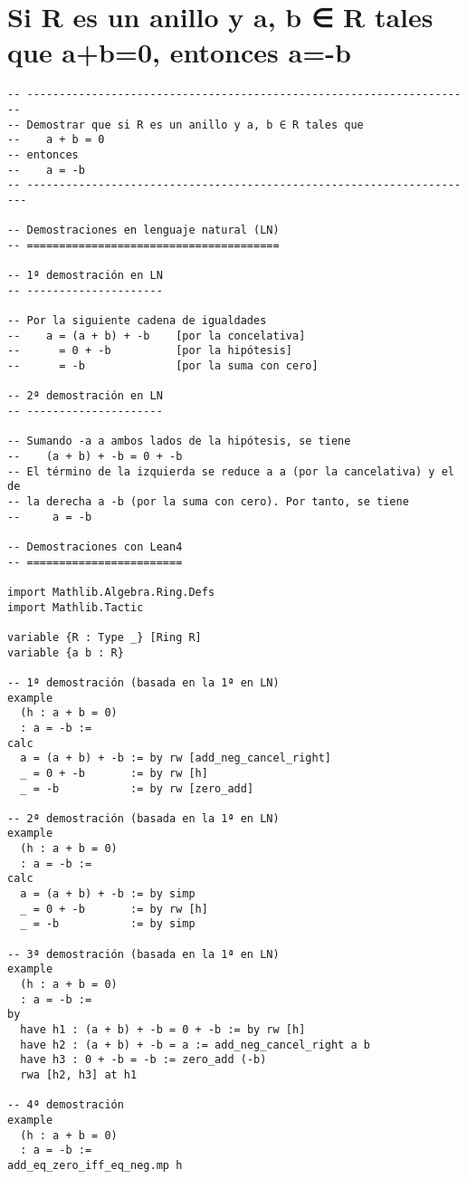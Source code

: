 \section{Si R es un anillo y a, b ∈ R tales que a+b=0, entonces a=-b}
\label{sec:org9cb1b63}
\begin{verbatim}
-- ---------------------------------------------------------------------
-- Demostrar que si R es un anillo y a, b ∈ R tales que
--    a + b = 0
-- entonces
--    a = -b
-- ----------------------------------------------------------------------

-- Demostraciones en lenguaje natural (LN)
-- =======================================

-- 1ª demostración en LN
-- ---------------------

-- Por la siguiente cadena de igualdades
--    a = (a + b) + -b    [por la concelativa]
--      = 0 + -b          [por la hipótesis]
--      = -b              [por la suma con cero]

-- 2ª demostración en LN
-- ---------------------

-- Sumando -a a ambos lados de la hipótesis, se tiene
--    (a + b) + -b = 0 + -b
-- El término de la izquierda se reduce a a (por la cancelativa) y el de
-- la derecha a -b (por la suma con cero). Por tanto, se tiene
--     a = -b

-- Demostraciones con Lean4
-- ========================

import Mathlib.Algebra.Ring.Defs
import Mathlib.Tactic

variable {R : Type _} [Ring R]
variable {a b : R}

-- 1ª demostración (basada en la 1ª en LN)
example
  (h : a + b = 0)
  : a = -b :=
calc
  a = (a + b) + -b := by rw [add_neg_cancel_right]
  _ = 0 + -b       := by rw [h]
  _ = -b           := by rw [zero_add]

-- 2ª demostración (basada en la 1ª en LN)
example
  (h : a + b = 0)
  : a = -b :=
calc
  a = (a + b) + -b := by simp
  _ = 0 + -b       := by rw [h]
  _ = -b           := by simp

-- 3ª demostración (basada en la 1ª en LN)
example
  (h : a + b = 0)
  : a = -b :=
by
  have h1 : (a + b) + -b = 0 + -b := by rw [h]
  have h2 : (a + b) + -b = a := add_neg_cancel_right a b
  have h3 : 0 + -b = -b := zero_add (-b)
  rwa [h2, h3] at h1

-- 4ª demostración
example
  (h : a + b = 0)
  : a = -b :=
add_eq_zero_iff_eq_neg.mp h
\end{verbatim}

